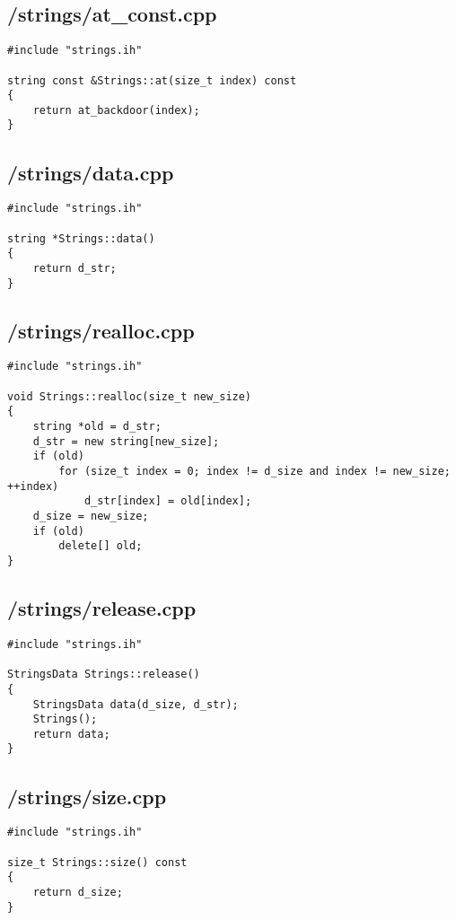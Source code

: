 \documentclass{article}
\begin{document}
\subsection*{/strings/at\_const.cpp}
\begin{verbatim}
#include "strings.ih"

string const &Strings::at(size_t index) const
{
    return at_backdoor(index);
}
\end{verbatim}
\subsection*{/strings/data.cpp}
\begin{verbatim}
#include "strings.ih"

string *Strings::data()
{
    return d_str;
}
\end{verbatim}
\subsection*{/strings/realloc.cpp}
\begin{verbatim}
#include "strings.ih"

void Strings::realloc(size_t new_size)
{
    string *old = d_str;
    d_str = new string[new_size];
    if (old)
        for (size_t index = 0; index != d_size and index != new_size; ++index)
            d_str[index] = old[index];
    d_size = new_size;
    if (old)
        delete[] old;
}
\end{verbatim}
\subsection*{/strings/release.cpp}
\begin{verbatim}
#include "strings.ih"

StringsData Strings::release()
{
    StringsData data(d_size, d_str);
    Strings();
    return data;
}
\end{verbatim}
\subsection*{/strings/size.cpp}
\begin{verbatim}
#include "strings.ih"

size_t Strings::size() const
{
    return d_size;   
}
\end{verbatim}
\end{document}
